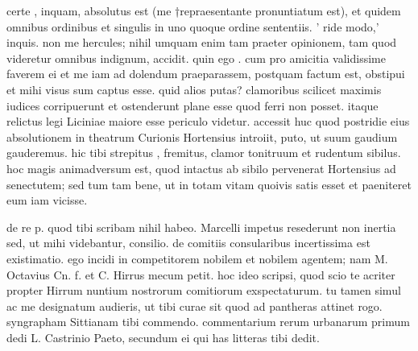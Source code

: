 


 certe , inquam, absolutus est (me †repraesentante pronuntiatum est), et quidem omnibus ordinibus et singulis in uno quoque ordine sententiis. ' ride modo,' inquis. non me hercules; nihil umquam enim tam praeter opinionem, tam quod videretur omnibus indignum, accidit. quin ego . cum pro amicitia validissime faverem ei et me iam ad dolendum praeparassem, postquam factum est, obstipui et mihi visus sum captus esse. quid alios putas? clamoribus scilicet maximis iudices corripuerunt et ostenderunt plane esse quod ferri non posset. itaque relictus legi Liciniae maiore esse periculo videtur. accessit huc quod postridie eius absolutionem in theatrum Curionis Hortensius introiit, puto, ut suum gaudium gauderemus. hic tibi strepitus , fremitus, clamor tonitruum et rudentum sibilus. hoc magis animadversum est, quod intactus ab sibilo pervenerat Hortensius ad senectutem; sed tum tam bene, ut in totam vitam quoivis satis esset et paeniteret eum iam vicisse.

 de re p. quod tibi scribam nihil habeo. Marcelli impetus resederunt non inertia sed, ut mihi videbantur, consilio. de comitiis consularibus incertissima est existimatio. ego incidi in competitorem nobilem et nobilem agentem; nam M. Octavius Cn. f. et C. Hirrus mecum petit. hoc ideo scripsi, quod scio te acriter propter Hirrum nuntium nostrorum comitiorum exspectaturum. tu tamen simul ac me designatum audieris, ut tibi curae sit quod ad pantheras attinet rogo. syngrapham Sittianam tibi commendo. commentarium rerum urbanarum primum dedi L. Castrinio Paeto, secundum ei qui has litteras tibi dedit.
